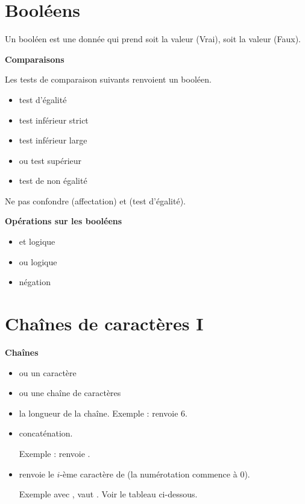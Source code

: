\documentclass[11pt,class=report,crop=false]{standalone}
\begin{document}
\section{Booléens}

Un booléen est une donnée qui prend soit la valeur  (\og{}Vrai\fg{}), soit la valeur  (\og{}Faux\fg{}).

  
\bigskip

\textbf{Comparaisons}
 
Les tests de comparaison suivants renvoient un booléen.
  \begin{itemize}
    \item {} \quad test d'égalité
    	\item {} \quad test inférieur strict
    	\item {} \quad test inférieur large
    	\item {} \quad ou \quad {}\quad test supérieur
    	\item {} \quad test de non égalité
  \end{itemize}
  
 Ne pas confondre \og{}\fg{} (affectation) et \og{}\fg{} (test d'égalité).
  
\bigskip
  
\textbf{Opérations sur les booléens}
  \begin{itemize}
    \item {} \quad \og{}et\fg{} logique
    	\item {} \quad \og{}ou\fg{} logique
    	\item {} \quad négation
  \end{itemize} 
  
  
\section{Chaînes de caractères I}

\textbf{Chaînes}

\begin{itemize}
  \item {} \quad ou\quad {} \quad un caractère
  \item {}\quad ou\quad {} \quad une chaîne de caractères
  \item {}\quad la longueur de la chaîne. Exemple :  renvoie $6$.
  \item {}\quad concaténation. 
  
  Exemple :  renvoie .
  
  \item {}\quad renvoie le $i$-ème caractère de  (la numérotation commence à $0$). 
  
  Exemple avec ,  vaut . Voir le tableau ci-dessous.
\end{itemize}
\end{document}

